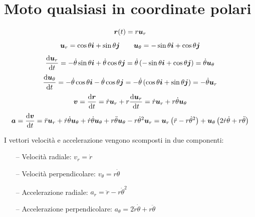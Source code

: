 \section{Moto qualsiasi in coordinate polari}
\begin{equation*}\boldsymbol{r}(t)=r\boldsymbol{u}_r\end{equation*}
\begin{equation*}\boldsymbol{u}_r=\cos\theta\boldsymbol{i}+\sin\theta\boldsymbol{j}\qquad \boldsymbol{u}_\theta=-\sin\theta\boldsymbol{i}+\cos\theta\boldsymbol{j}\end{equation*}
$$\frac{\mathrm{d}\boldsymbol{u}_r}{\mathrm{d} t}=-\dot\theta\sin\theta\boldsymbol{i}+\dot\theta\cos\theta\boldsymbol{j}=\dot\theta\left(-\sin\theta\boldsymbol{i}+\cos\theta\boldsymbol{j}\right)=\dot\theta\boldsymbol{u}_\theta$$
$$\frac{\mathrm{d}\boldsymbol{u}_\theta}{\mathrm{d} t}=-\dot\theta\cos\theta\boldsymbol{i}-\dot\theta\cos\theta\boldsymbol{j}=-\dot\theta\left(\cos\theta\boldsymbol{i}+\sin\theta\boldsymbol{j}\right)=-\dot\theta\boldsymbol{u}_r$$
$$\boldsymbol{v}=\frac{\mathrm{d}\boldsymbol{r}}{\mathrm{d} t}=\dot r\boldsymbol{u}_r+r\frac{\mathrm{d}\boldsymbol{u}_r}{\mathrm{d} t}=\dot r\boldsymbol{u}_r+r\dot\theta\boldsymbol{u}_\theta$$
$$\boldsymbol{a}=\frac{\mathrm{d}\boldsymbol{v}}{\mathrm{d} t}=\ddot r\boldsymbol{u}_r+\dot
r\dot\theta\boldsymbol{u}_\theta+\dot r\dot\theta\boldsymbol{u}_\theta+r\ddot\theta\boldsymbol{u}_\theta-r\dot\theta^2\boldsymbol{u}_r=\boldsymbol{u}_r\left(\ddot r-r\dot\theta^2\right)+\boldsymbol{u}_\theta\left(2\dot
r\dot\theta+r\ddot\theta\right)$$

 I vettori velocità e accelerazione vengono scomposti in due
componenti:
\begin{enumerate}
\item[--] Velocità radiale: $v_r=\dot r$
\item[--] Velocità perpendicolare: $v_\theta=r\dot\theta$
\item[--] Accelerazione radiale: $a_r=\ddot r-r\dot\theta^2$
\item[--] Accelerazione perpendicolare: $a_\theta=2\dot r\dot\theta+r\ddot
\theta$
\end{enumerate}
